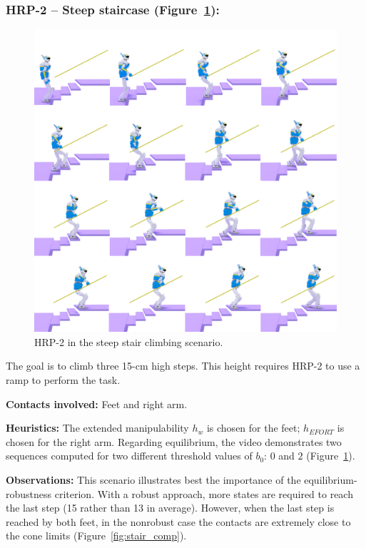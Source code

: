 \subsubsection{HRP-2 -- Steep staircase (Figure~\ref{fig:stair_robust}):}

\begin{figure}
  \centering
  \includegraphics[width=0.5\linewidth]{figures/stair}
  \caption{
           HRP-2 in the steep stair climbing scenario. }
		   \label{fig:stair_robust}
\end{figure}

The goal is to climb three 15-cm high steps. This height requires HRP-2 to use a ramp to perform the task.

\noindent\textbf{Contacts involved:} Feet and right arm.

\noindent\textbf{Heuristics:} The extended manipulability $h_w$ is chosen for the feet; $h_{EFORT}$ is chosen for the right arm.
Regarding equilibrium, the video demonstrates two sequences computed for two different threshold values of $b_0$: $0$ and $2$ (Figure~\ref{fig:stair_robust}). 

\noindent\textbf{Observations:}
This scenario illustrates best the importance of the equilibrium-robustness criterion.
With a robust approach, more states are required to reach the last step (15 rather than 13 in average).
However, when the last step is reached by both feet, in the nonrobust case the contacts are extremely close to 
the cone limits (Figure~\ref{fig:stair_comp}).


